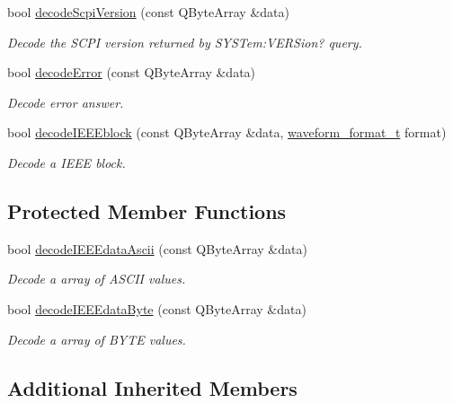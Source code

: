 \begin{DoxyCompactItemize}
bool \hyperlink{classmdt_frame_codec_scpi_a3ae1183cbe26272a7a025e89fc961042}{decode\-Scpi\-Version} (const Q\-Byte\-Array \&data)
\begin{DoxyCompactList}\small\item\em Decode the S\-C\-P\-I version returned by S\-Y\-S\-Tem\-:V\-E\-R\-Sion? query. \end{DoxyCompactList}\item 
bool \hyperlink{classmdt_frame_codec_scpi_a9e38d8afadc7ff37821620feea6b0899}{decode\-Error} (const Q\-Byte\-Array \&data)
\begin{DoxyCompactList}\small\item\em Decode error answer. \end{DoxyCompactList}\item 
bool \hyperlink{classmdt_frame_codec_scpi_a4b07da48ad126c56db050a379700ac2b}{decode\-I\-E\-E\-Eblock} (const Q\-Byte\-Array \&data, \hyperlink{classmdt_frame_codec_scpi_a0562eccf33d8cf62e7a73a748a70c475}{waveform\-\_\-format\-\_\-t} format)
\begin{DoxyCompactList}\small\item\em Decode a I\-E\-E\-E block. \end{DoxyCompactList}\end{DoxyCompactItemize}
\subsection*{Protected Member Functions}
\begin{DoxyCompactItemize}
\item 
bool \hyperlink{classmdt_frame_codec_scpi_aa6596dc898438be704191ad282d02100}{decode\-I\-E\-E\-Edata\-Ascii} (const Q\-Byte\-Array \&data)
\begin{DoxyCompactList}\small\item\em Decode a array of A\-S\-C\-I\-I values. \end{DoxyCompactList}\item 
bool \hyperlink{classmdt_frame_codec_scpi_ab70c6c3d2d91ddff065952b6c2db8345}{decode\-I\-E\-E\-Edata\-Byte} (const Q\-Byte\-Array \&data)
\begin{DoxyCompactList}\small\item\em Decode a array of B\-Y\-T\-E values. \end{DoxyCompactList}\end{DoxyCompactItemize}
\subsection*{Additional Inherited Members}


